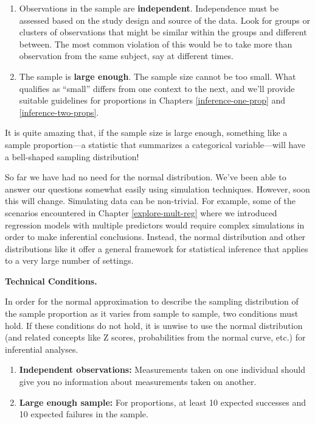 \documentclass[
  10pt,
  openany]{book}
\providecommand{\tightlist}{%
  \setlength{\itemsep}{0pt}\setlength{\parskip}{0pt}}
\theoremstyle{definition}
\theoremstyle{definition}
\theoremstyle{definition}
\theoremstyle{definition}
\theoremstyle{remark}
\begin{document}
\begin{enumerate}
\def\labelenumi{\arabic{enumi}.}
\item
  Observations in the sample are \textbf{independent}.
  Independence must be assessed based on the study design and source of the data. Look for groups or clusters of observations that might be similar within the groups and different between. The most common violation of this would be to take more than observation from the same subject, say at different times.
\item
  The sample is \textbf{large enough}.
  The sample size cannot be too small.
  What qualifies as ``small'' differs from one context to the next, and we'll provide suitable guidelines for proportions in Chapters \ref{inference-one-prop} and \ref{inference-two-props}.
\end{enumerate}

It is quite amazing that, if the sample size is large enough, something like a sample proportion---a statistic that summarizes a categorical variable---will have a bell-shaped sampling distribution!

So far we have had no need for the normal distribution.
We've been able to answer our questions somewhat easily using simulation techniques.
However, soon this will change.
Simulating data can be non-trivial.
For example, some of the scenarios encountered in Chapter \ref{explore-mult-reg} where we introduced regression models with multiple predictors would require complex simulations in order to make inferential conclusions.
Instead, the normal distribution and other distributions like it offer a general framework for statistical inference that applies to a very large number of settings.

\begin{onebox}

\textbf{Technical Conditions.}

In order for the normal approximation to describe the sampling distribution of the sample proportion as it varies from sample to sample, two conditions must hold.
If these conditions do not hold, it is unwise to use the normal distribution (and related concepts like Z scores, probabilities from the normal curve, etc.) for inferential analyses.

\begin{enumerate}
\def\labelenumi{\arabic{enumi}.}
\tightlist
\item
  \textbf{Independent observations:} Measurements taken on one individual should give you no information about measurements taken on another.
\item
  \textbf{Large enough sample:} For proportions, at least 10 expected successes and 10 expected failures in the sample.
\end{enumerate}

\end{onebox}
\end{document}
